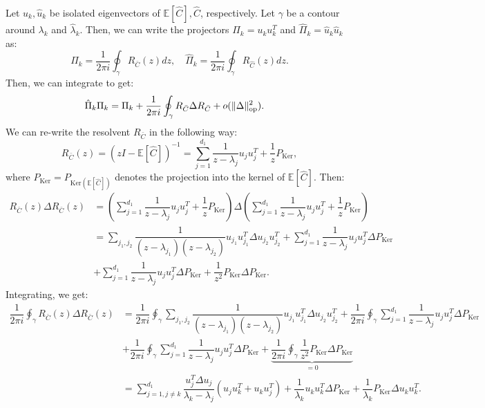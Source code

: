 \documentclass[]{article}
\numberwithin{equation}{section}
\theoremstyle{definition}
\newcommand{\EE}{\mathbb{E}}
\def\op{{\rm op}}
\begin{document}
Let $u_k, \hat{u}_{k}$ be isolated eigenvectors of $\EE[\hat{C}], \hat{C}$, respectively. Let $\gamma$ be a contour around $\lambda_{k}$ and $\hat{\lambda}_{k}$. Then, we can write the projectors $\Pi_{k} = u_k u_k^T$ and $\hat{\Pi}_{k} = \hat{u}_k \hat{u}_k$ as: 
\begin{equation}
    \Pi_{k} = \dfrac{1}{2\pi i}\oint_{\gamma} R_{\bar{C}}(z) dz, \quad  \hat{\Pi}_{k} = \dfrac{1}{2\pi i}\oint_{\gamma} R_{\hat{C}}(z) dz. 
\end{equation}
Then, we can integrate  to get: 
\begin{align}
    \hat{\Pi}_{k}\Pi_{k} &= \Pi_{k} + \dfrac{1}{2 \pi i} \oint_{\gamma} R_{\bar{C}}\Delta R_{\bar{C}} + o(\| \Delta\|_\op^2). 
    \label{eq:series_projection_k}
\end{align}
We can re-write the resolvent $R_{\bar{C}}$ in the following way: 
\begin{equation}
    R_{\bar{C}}(z) = (z I - \EE[\hat{C}])^{-1} = \sum_{j=1}^{d_1} \dfrac{1}{z - \lambda_{j}} u_{j}u_j^T + \dfrac{1}{z} P_{\mathrm{Ker}}, 
\end{equation}
where $P_{\mathrm{Ker}} = P_{\mathrm{Ker}(\EE[\hat{C}])}$ denotes the projection into the kernel of $\EE[\hat{C}]$. Then: 
\begin{align}
    R_{\bar{C}}(z)\Delta R_{\bar{C}}(z)  &= \left ( \sum_{j=1}^{d_1} \dfrac{1}{z - \lambda_{j}} u_{j}u_j^T + \dfrac{1}{z} P_{\mathrm{Ker}}\right ) \Delta \left (\sum_{j=1}^{d_1} \dfrac{1}{z - \lambda_{j}} u_{j}u_j^T + \dfrac{1}{z} P_{\mathrm{Ker}} \right ) \\ 
    & = \sum_{j_1,j_2} \dfrac{1}{(z- \lambda_{j_1}) (z - \lambda_{j_2})} u_{j_1}u_{j_1}^T \Delta u_{j_2} u_{j_2}^T + \sum_{j=1}^{d_1} \dfrac{1}{z-\lambda_{j}} u_{j}u_{j}^T \Delta P_{\mathrm{Ker}} \\
    & + \sum_{j=1}^{d_1} \dfrac{1}{z-\lambda_{j}} u_{j}u_{j}^T \Delta P_{\mathrm{Ker}} + \dfrac{1}{z^2}  P_{\mathrm{Ker}}\Delta P_{\mathrm{Ker}}. 
\end{align}
Integrating, we get: 
\begin{align}
    \dfrac{1}{2\pi i }\oint_{\gamma} R_{\bar{C}}(z)\Delta R_{\bar{C}}(z) &=  \dfrac{1}{2\pi i }\oint_{\gamma}\sum_{j_1,j_2} \dfrac{1}{(z- \lambda_{j_1}) (z - \lambda_{j_2})} u_{j_1}u_{j_1}^T \Delta u_{j_2} u_{j_2}^T + \dfrac{1}{2\pi i }\oint_{\gamma}\sum_{j=1}^{d_1} \dfrac{1}{z-\lambda_{j}} u_{j}u_{j}^T \Delta P_{\mathrm{Ker}} \\
    & + \dfrac{1}{2\pi i }\oint_{\gamma}\sum_{j=1}^{d_1} \dfrac{1}{z-\lambda_{j}} u_{j}u_{j}^T \Delta P_{\mathrm{Ker}} + \underbrace{\dfrac{1}{2\pi i }\oint_{\gamma}\dfrac{1}{z^2}  P_{\mathrm{Ker}}\Delta P_{\mathrm{Ker}}}_{=0} \\ 
    & = \sum_{j=1, j\not = k}^{d_1} \dfrac{u_{j}^T \Delta u_{j}}{\lambda_{k} - \lambda_{j}}\left ( u_{j} u_{k}^T + u_{k} u_{j}^T \right ) + \dfrac{1}{\lambda_{k}} u_{k} u_{k}^T \Delta P_{\mathrm{Ker}} +  \dfrac{1}{\lambda_{k}} P_{\mathrm{Ker}} \Delta u_{k} u_{k}^T. 
\end{align}
\end{document}

